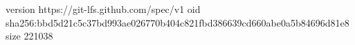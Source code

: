 version https://git-lfs.github.com/spec/v1
oid sha256:bbd5d21c5c37bd993ae026770b404c821fbd386639cd660abe0a5b84696d81e8
size 221038
